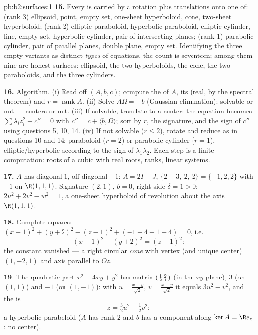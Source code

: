\begin{solution}{pb:b2:surfaces:1}
\textbf{15.} Every  is carried by a rotation plus
translations onto one of: (rank 3) ellipsoid, point, empty
set, one-sheet hyperboloid, cone, two-sheet hyperboloid;
(rank 2) elliptic paraboloid, hyperbolic paraboloid, elliptic
cylinder, line, empty set, hyperbolic cylinder, pair of
intersecting planes; (rank 1) parabolic cylinder, pair of
parallel planes, double plane, empty set. Identifying the
three empty variants as distinct \emph{ types} of
equations, the count is seventeen; among them nine are honest
surfaces: ellipsoid, the two hyperboloids, the cone, the two
paraboloids, and the three cylinders.

\textbf{16.} Algorithm. (i) Read off $(A, b, c)$; compute the
 of $A$, its  (real, by
the spectral theorem) and $r = \operatorname{rank}A$. (ii)
Solve $A\Omega = -b$ (Gaussian elimination): solvable or not
--- centers or not. (iii) If solvable, translate to a center:
the equation becomes $\sum\lambda_iz_i^2 + c'' = 0$ with $c''
= c + \langle b, \Omega\rangle$; sort by $r$, the signature,
and the sign of $c''$ using questions 5, 10, 14. (iv) If not
solvable ($r \leq 2$), rotate and reduce as in questions 10
and 14: paraboloid ($r = 2$) or parabolic cylinder ($r = 1$),
elliptic/hyperbolic according to the sign of
$\lambda_1\lambda_2$. Each step is a finite computation:
roots of a cubic with real roots, ranks, linear systems.

\textbf{17.} $A$ has diagonal $1$, off-diagonal $-1$: $A = 2I
- J$,  $\{2 - 3,\ 2,\ 2\} = \{-1, 2, 2\}$ with $-1$
on $\R(1,1,1)$. Signature $(2,1)$, $b = 0$, right side
$\delta = 1 > 0$: $2u^2 + 2v^2 - w^2 = 1$, a one-sheet
hyperboloid of revolution about the axis $\R(1,1,1)$.

\textbf{18.} Complete squares: $(x-1)^2 + (y+2)^2 - (z-1)^2 +
(-1 - 4 + 1 + 4) = 0$, i.e.
\[
(x-1)^2 + (y+2)^2 = (z-1)^2 :
\]
the constant vanished --- a right circular \emph{cone} with
vertex (and unique center) $(1, -2, 1)$ and axis parallel to
$Oz$.

\textbf{19.} The quadratic part $x^2 + 4xy + y^2$ has matrix
$\begin{psmallmatrix}1 & 2\\ 2 & 1\end{psmallmatrix}$ (in the
$xy$-plane),  $3$ (on $(1,1)$) and $-1$ (on
$(1,-1)$): with $u = \frac{x+y}{\sqrt2}$, $v =
\frac{x-y}{\sqrt2}$ it equals $3u^2 - v^2$, and the 
is
\[
z = \tfrac32u^2 - \tfrac12v^2 :
\]
a hyperbolic paraboloid ($A$ has rank $2$ and $b$ has a
component along $\ker A = \R e_z$: no center).


\end{solution}
